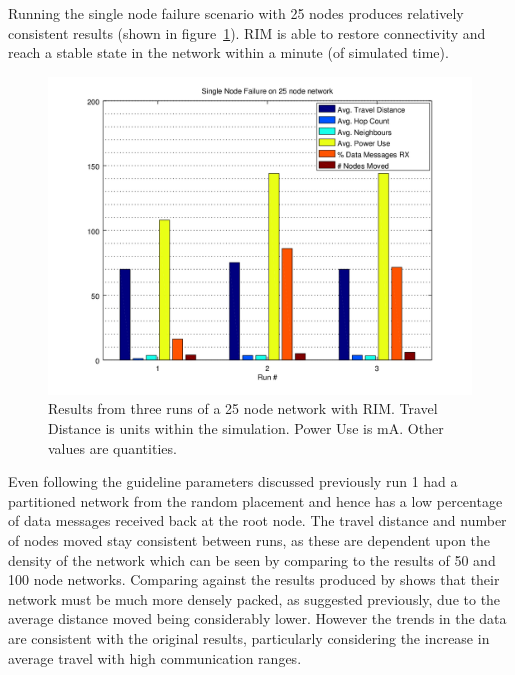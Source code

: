 \documentclass[authoryearcitations]{UoYCSproject}
\begin{document}
Running the single node failure scenario with 25 nodes produces relatively consistent results (shown in figure~\ref{fig:singlefail_25node}). RIM is able to restore connectivity and reach a stable state in the network within a minute (of simulated time).

\begin{figure}
 \centering
    \includegraphics[width=\textwidth]{figures/singlefail_25node.png}
    \caption[Results from three runs of a 25 node network with RIM.]{Results from three runs of a 25 node network with RIM. Travel Distance is units within the simulation. Power Use is mA. Other values are quantities.}
    \label{fig:singlefail_25node}
\end{figure}

Even following the guideline parameters discussed previously run 1 had a partitioned network from the random placement and hence has a low percentage of data messages received back at the root node. The travel distance and number of nodes moved stay consistent between runs, as these are dependent upon the density of the network which can be seen by comparing to the results of 50 and 100 node networks. Comparing against the results produced by \citeauthor*{Younis2010} shows that their network must be much more densely packed, as suggested previously, due to the average distance moved being considerably lower. However the trends in the data are consistent with the original results, particularly considering the increase in average travel with high communication ranges.
\end{document}
